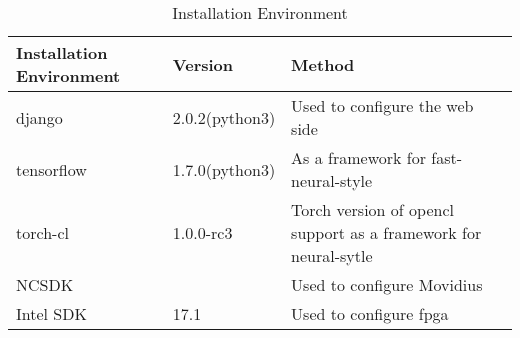 \begin{table}[H]
\centering
\begin{tabular}{lll}
\toprule
  Installation Environment&Version&Method\\
\midrule
	django&2.0.2(python3)&Used to configure the web side\\
	tensorflow&1.7.0(python3) & As a framework for fast-neural-style\\
	torch-cl&1.0.0-rc3&Torch version of opencl support as a framework for neural-sytle\\
	NCSDK&& Used to configure Movidius\\
	Intel SDK&17.1&Used to configure fpga \\
\bottomrule
\end{tabular}
\caption{Installation Environment}
  \label{tbl:environment}
\end{table}
